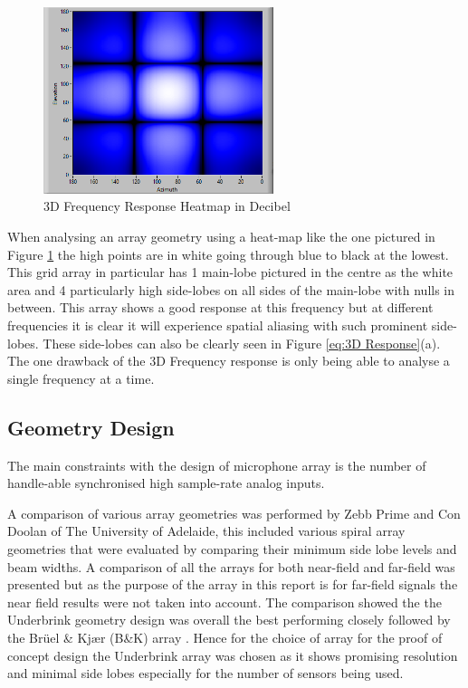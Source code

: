 \documentclass{UoNMCHA}
\numberwithin{equation}{section}
\begin{document}
    \begin{figure}[H]
        \centering
        \includegraphics[keepaspectratio, width = 0.6\textwidth]{Figures/3DHeatFigure.png}
        \caption{3D Frequency Response Heatmap in Decibel}
        \label{fig:3D Heatmap}
    \end{figure}
    
    When analysing an array geometry using a heat-map like the one pictured in Figure \ref{fig:3D Heatmap} the high points are in white going through blue to black at the lowest. This grid array in particular has 1 main-lobe pictured in the centre as the white area and 4 particularly high side-lobes on all sides of the main-lobe with nulls in between. This array shows a good response at this frequency but at different frequencies it is clear it will experience spatial aliasing with such prominent side-lobes. These side-lobes can also be clearly seen in Figure \ref{eq:3D Response}(a). The one drawback of the 3D Frequency response is only being able to analyse a single frequency at a time.

\subsection{Geometry Design} \label{sec:Array Geometry}

    The main constraints with the design of microphone array is the number of handle-able synchronised high sample-rate analog inputs.
    
    A comparison of various array geometries was performed by Zebb Prime and Con Doolan of The University of Adelaide, this included various spiral array geometries that were evaluated by comparing their minimum side lobe levels and beam widths. A comparison of all the arrays for both near-field and far-field was presented but as the purpose of the array in this report is for far-field signals the near field results were not taken into account. The comparison showed the the Underbrink geometry design was overall the best performing closely followed by the Brüel \& Kjær (B\&K) array \citep{Pri13}. Hence for the choice of array for the proof of concept design the Underbrink array was chosen as it shows promising resolution and minimal side lobes especially for the number of sensors being used.
    
\end{document}
